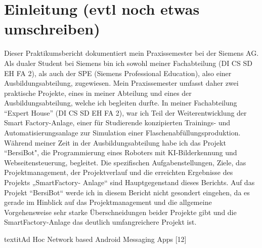 \chapter{Einleitung (evtl noch etwas umschreiben)}\label{ch:data}

\label{sec:Einleitung}

Dieser Praktikumsbericht dokumentiert mein Praxissemester bei der Siemens AG.
Als dualer Student bei Siemens bin ich sowohl meiner Fachabteilung (DI CS SD EH FA 2), als auch der SPE  (Siemens Professional Education), also einer Ausbildungsabteilung, zugewiesen.
Mein Praxissemester umfasst daher zwei praktische Projekte, eines in meiner Abteilung und eines der Ausbildungsabteilung, welche ich begleiten durfte. In meiner Fachabteilung “Expert House” (DI CS SD EH FA 2), war ich Teil der Weiterentwicklung der Smart Factory-Anlage, einer für Studierende konzipierten Trainings- und Automatisierungsanlage zur Simulation einer Flaschenabfüllungsproduktion. Während meiner Zeit in der Ausbildungsabteilung habe ich das Projekt “BersiBot", die Programmierung eines Roboters mit KI-Bilderkennung und Webseitensteuerung, begleitet.
Die spezifischen Aufgabenstellungen, Ziele, das Projektmanagement,
der Projektverlauf und die erreichten Ergebnisse des Projekts „SmartFactory-
Anlage“ sind Hauptgegenstand dieses Berichts. Auf das Projekt “BersiBot“ werde
ich in diesem Bericht nicht gesondert eingehen, da es gerade im Hinblick auf das
Projektmanagement und die allgemeine Vorgehensweise sehr starke
Überschneidungen beider Projekte gibt und die SmartFactory-Anlage das deutlich
umfangreichere Projekt ist.

textit{Ad Hoc Network based Android Messaging Apps} [12] 